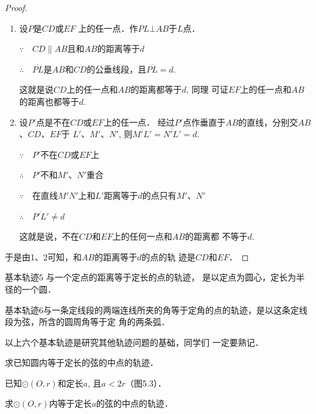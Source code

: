 \begin{proof}
\begin{enumerate}
    \item 设$P$是$CD$或$EF$ 上的任一点．作$PL\bot AB$于$L$点．

$\because\quad CD\parallel AB$且和$AB$的距离等于$d$

$\therefore\quad \overline{PL}$是$AB$和$CD$的公垂线段，且$\overline{PL}=d$.

这就是说$CD$上的任一点和$AB$的距离都等于$d$, 同理
可证$EF$上的任一点和$AB$的距离也都等于$d$.
\item 设$P'$点是不在$CD$或$EF$上的任一点．
经过$P'$点作垂直于$AB$的直线，分别交$AB$、$CD$、$EF$于
$L'$、$M'$、$N'$, 则$\overline{M'L'}=\overline{N'L'}=d$.

$\because\quad P'$不在$CD$或$EF$上

$\therefore\quad P'$不和$M'$、$N'$重合

$\because\quad $在直线$M'N'$上和$L'$距离等于$d$的点只有$M'$、$N'$

$\therefore\quad \overline{P'L'}\ne d$

这就是说，不在$CD$和$EF$上的任何一点和$AB$的距离都
不等于$d$.
\end{enumerate}

于是由1、2可知，和$AB$的距离等于$d$的点的轨
迹是$CD$和$EF$．
\end{proof}

\begin{blk}
    {基本轨迹5} 与一个定点的距离等于定长的点的轨迹，
是以定点为圆心，定长为半径的一个圆．
\end{blk}

\begin{blk}
    {基本轨迹6}与一条定线段的两端连线所夹的角等于定角的点的轨迹，是以这条定线段为弦，所含的圆周角等于定
    角的两条弧．
\end{blk}

以上六个基本轨迹是研究其他轨迹问题的基础，同学们
一定要熟记．

\begin{example}
    求已知圆内等于定长的弦的中点的轨迹．

    已知$\odot (O,r)$和定长$a$, 且$a<2r$（图5.3）．

    求$\odot (O,r)$内等于定长$a$的弦的中点的轨迹．
\end{example}

\begin{figure}[htp]
    \centering
{}
    \caption{}
\end{figure}

